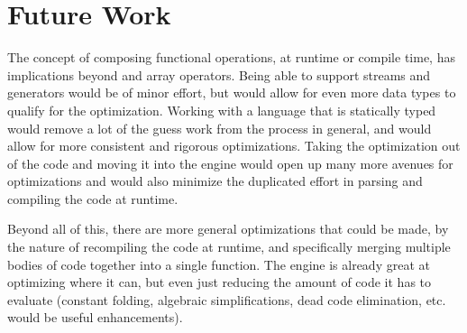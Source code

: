 \chapter{Future Work}

The concept of composing functional operations, at runtime or compile time, has implications beyond \javascript and array operators. Being able to support streams and generators would be of minor effort, but would allow for even more data types to qualify for the optimization.  Working with a language that is statically typed would remove a lot of the guess work from the process in general, and would allow for more consistent and rigorous optimizations.  Taking the optimization out of the \javascript code and moving it into the engine would open up many more avenues for optimizations and would also minimize the duplicated effort in parsing and compiling the \javascript code at runtime.

Beyond all of this, there are more general optimizations that could be made, by the nature of recompiling the code at runtime, and specifically merging multiple bodies of code together into a single function.  The \veight \javascript engine is already great at optimizing where it can, but even just reducing the amount of code it has to evaluate (constant folding, algebraic simplifications, dead code elimination, etc. would be useful enhancements).